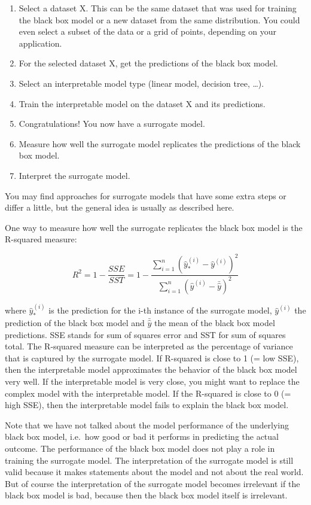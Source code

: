 \documentclass[
  11pt,
]{scrbook}
\providecommand{\tightlist}{%
  \setlength{\itemsep}{0pt}\setlength{\parskip}{0pt}}
\begin{document}
\begin{enumerate}
\def\labelenumi{\arabic{enumi}.}
\tightlist
\item
  Select a dataset X.
  This can be the same dataset that was used for training the black box model or a new dataset from the same distribution.
  You could even select a subset of the data or a grid of points, depending on your application.
\item
  For the selected dataset X, get the predictions of the black box model.
\item
  Select an interpretable model type (linear model, decision tree, \ldots).
\item
  Train the interpretable model on the dataset X and its predictions.
\item
  Congratulations! You now have a surrogate model.
\item
  Measure how well the surrogate model replicates the predictions of the black box model.
\item
  Interpret the surrogate model.
\end{enumerate}

You may find approaches for surrogate models that have some extra steps or differ a little, but the general idea is usually as described here.

One way to measure how well the surrogate replicates the black box model is the R-squared measure:

\[R^2=1-\frac{SSE}{SST}=1-\frac{\sum_{i=1}^n(\hat{y}_*^{(i)}-\hat{y}^{(i)})^2}{\sum_{i=1}^n(\hat{y}^{(i)}-\bar{\hat{y}})^2}\]

where \(\hat{y}_*^{(i)}\) is the prediction for the i-th instance of the surrogate model, \(\hat{y}^{(i)}\) the prediction of the black box model and \(\bar{\hat{y}}\) the mean of the black box model predictions.
SSE stands for sum of squares error and SST for sum of squares total.
The R-squared measure can be interpreted as the percentage of variance that is captured by the surrogate model.
If R-squared is close to 1 (= low SSE), then the interpretable model approximates the behavior of the black box model very well.
If the interpretable model is very close, you might want to replace the complex model with the interpretable model.
If the R-squared is close to 0 (= high SSE), then the interpretable model fails to explain the black box model.

Note that we have not talked about the model performance of the underlying black box model, i.e.~how good or bad it performs in predicting the actual outcome.
The performance of the black box model does not play a role in training the surrogate model.
The interpretation of the surrogate model is still valid because it makes statements about the model and not about the real world.
But of course the interpretation of the surrogate model becomes irrelevant if the black box model is bad, because then the black box model itself is irrelevant.
\end{document}
